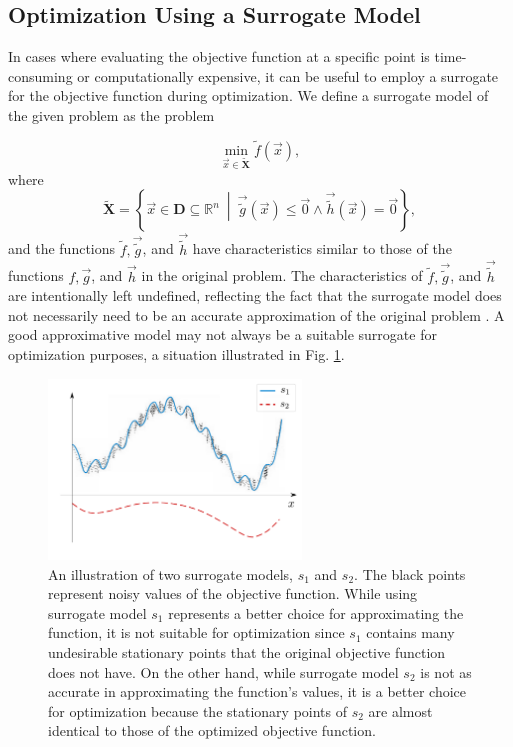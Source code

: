 \subsection{Optimization Using a Surrogate Model}\label{model-based}
In cases where evaluating the objective function at a specific point is time-consuming or computationally expensive, it can be useful to employ a surrogate for the objective function during optimization. We define a surrogate model of the given problem as the problem

\begin{equation}
	\min_{\vec{x} \in \mathbf{\tilde{X}}} \tilde{f}(\vec{x}),
\end{equation}
where
\begin{equation}
	\mathbf{\tilde{X}} = \left\{ \vec{x} \in \mathbf{D} \subseteq \mathbb{R}^n \ \middle| \ \vec{\tilde{g}} (\vec{x}) \leq \vec{0} \wedge \vec{\tilde{h}} (\vec{x}) = \vec{0} \right\},
\end{equation}
and the functions \( \tilde{f}, \vec{\tilde{g}} \), and \( \vec{\tilde{h}} \) have characteristics similar to those of the functions \( f, \vec{g} \), and \( \vec{h} \) in the original problem. The characteristics of \( \tilde{f}, \vec{\tilde{g}} \), and \( \vec{\tilde{h}} \) are intentionally left undefined, reflecting the fact that the surrogate model does not necessarily need to be an accurate approximation of the original problem \cite{two-decades, BBO-textbook, Kramer2011}. A good approximative model may not always be a suitable surrogate for optimization purposes, a situation illustrated in Fig. \ref{fig:surrogate}.

\begin{figure}[H]
	\centering
	\includegraphics[width=0.6\textwidth]{figures/surrogate.pdf}
	\caption{An illustration of two surrogate models, $ s_1 $ and $ s_2 $. The black points represent noisy values of the objective function. While using surrogate model $ s_1 $ represents a better choice for approximating the function, it is not suitable for optimization since $ s_1 $ contains many undesirable stationary points that the original objective function does not have. On the other hand, while surrogate model $ s_2 $ is not as accurate in approximating the function's values, it is a better choice for optimization because the stationary points of $ s_2 $ are almost identical to those of the optimized objective function.}
	\label{fig:surrogate}
\end{figure}

